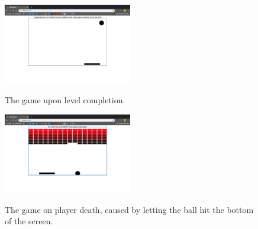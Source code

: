 \documentclass[12pt]{article}
\begin{document}
\begin{figure}[ht]
  \centering
  \caption{The game upon level completion.}
  \includegraphics[width=0.5\textwidth]{levelcomplete.png}
  \label{fig:levelcomplete}
\end{figure}

\begin{figure}[ht]
  \centering
  \caption{The game on player death, caused by letting the ball hit the bottom of the screen.}
  \includegraphics[width=0.5\textwidth]{dead.png}
  \label{fig:dead}
\end{figure}
\end{document}
